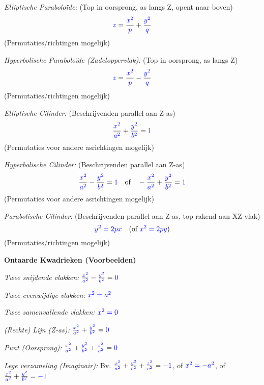 \documentclass[12pt]{article}
\newcommand{\scalar}[1]{\textcolor{scalarBrightBlue}{#1}}
\begin{document}
\vspace{1em}
\textit{Elliptische Paraboloïde:} (Top in oorsprong, as langs Z, opent naar boven)
\[
\scalar{z} = \frac{\scalar{x^2}}{\scalar{p}} + \frac{\scalar{y^2}}{\scalar{q}}
\]
(Permutaties/richtingen mogelijk)

\vspace{1em}
\textit{Hyperbolische Paraboloïde (Zadeloppervlak):} (Top in oorsprong, as langs Z)
\[
\scalar{z} = \frac{\scalar{x^2}}{\scalar{p}} - \frac{\scalar{y^2}}{\scalar{q}}
\]
(Permutaties/richtingen mogelijk)

\vspace{1em}
\textit{Elliptische Cilinder:} (Beschrijvenden parallel aan Z-as)
\[
\frac{\scalar{x^2}}{\scalar{a^2}} + \frac{\scalar{y^2}}{\scalar{b^2}} = \scalar{1}
\]
(Permutaties voor andere asrichtingen mogelijk)

\vspace{1em}
\textit{Hyperbolische Cilinder:} (Beschrijvenden parallel aan Z-as)
\[
\frac{\scalar{x^2}}{\scalar{a^2}} - \frac{\scalar{y^2}}{\scalar{b^2}} = \scalar{1} \quad \text{of} \quad -\frac{\scalar{x^2}}{\scalar{a^2}} + \frac{\scalar{y^2}}{\scalar{b^2}} = \scalar{1}
\]
(Permutaties voor andere asrichtingen mogelijk)

\vspace{1em}
\textit{Parabolische Cilinder:} (Beschrijvenden parallel aan Z-as, top rakend aan XZ-vlak)
\[
\scalar{y^2 = 2px} \quad (\text{of } \scalar{x^2 = 2py})
\]
(Permutaties/richtingen mogelijk)

\vspace{1.5em} %
{\centering
\textcolor{headerBrown}{\large\textbf{Ontaarde Kwadrieken (Voorbeelden)}}
\par
}%
\textit{Twee snijdende vlakken:} $\frac{\scalar{x^2}}{\scalar{a^2}} - \frac{\scalar{y^2}}{\scalar{b^2}} = \scalar{0}$

\vspace{0.5em}
\textit{Twee evenwijdige vlakken:} $\scalar{x^2 = a^2}$

\vspace{0.5em}
\textit{Twee samenvallende vlakken:} $\scalar{x^2 = 0}$

\vspace{0.5em}
\textit{(Rechte) Lijn (Z-as):} $\frac{\scalar{x^2}}{\scalar{a^2}} + \frac{\scalar{y^2}}{\scalar{b^2}} = \scalar{0}$

\vspace{0.5em}
\textit{Punt (Oorsprong):} $\frac{\scalar{x^2}}{\scalar{a^2}} + \frac{\scalar{y^2}}{\scalar{b^2}} + \frac{\scalar{z^2}}{\scalar{c^2}} = \scalar{0}$

\vspace{0.5em}
\textit{Lege verzameling (Imaginair):} Bv. $\frac{\scalar{x^2}}{\scalar{a^2}} + \frac{\scalar{y^2}}{\scalar{b^2}} + \frac{\scalar{z^2}}{\scalar{c^2}} = \scalar{-1}$, of $\scalar{x^2 = -a^2}$, of $\frac{\scalar{x^2}}{\scalar{a^2}} + \frac{\scalar{y^2}}{\scalar{b^2}} = \scalar{-1}$
\end{document}

